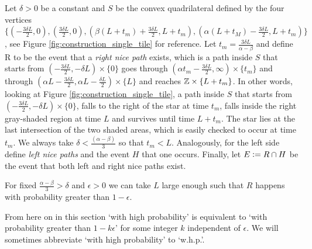Let $\delta > 0$ be a constant and $S$ be the convex quadrilateral defined by the four vertices $\{(- \frac{3 \delta L}{2}, 0), (\frac{3 \delta L}{2}, 0), (\beta (L + t_m) + \frac{3 \delta L}{2}, L + t_m), (\alpha (L + t_M) - \frac{3 \delta L}{2}, L + t_m) \}$, see Figure \ref{fig:construction_single_tile} for reference. Let $t_m = \frac{3\delta L }{\alpha - \beta}$ and define R to be the event that a \textit{right nice path} exists, which is a path inside $S$ that starts from $(- \frac{3 \delta L}{2}, - \delta L) \times \{0\}$ goes through $(\alpha t_m - \frac{ 3 \delta L }{2}, \infty) \times \{t_m\}$ and through $(\alpha L - \frac{3 \delta L}{2},\alpha L - \frac{\delta L}{2}) \times \{L\}$ and reaches $\mathbb{Z} \times \{ L + t_m \}$. In other words, looking at Figure \ref{fig:construction_single_tile}, a path inside $S$ that starts from $(- \frac{3 \delta L}{2}, - \delta L) \times \{0\}$, falls to the right of the star at time $t_m$, falls inside the right gray-shaded region at time $L$ and survives until time $L + t_m$. The star lies at the last intersection of the two shaded areas, which is easily checked to occur at time $t_m$. We always take $\delta < \frac{(\alpha - \beta)}{3}$ so that $t_m < L$. Analogously, for the left side define \textit{left nice paths} and the event $H$ that one occurs. Finally, let $E \vcentcolon= R \cap H$ be the event that both left and right nice paths exist. \\

\begin{lemma}\label{lem:construction}
For fixed $\frac{\alpha - \beta}{3} > \delta$ and $\epsilon > 0$ we can take $L$ large enough such that $R$ happens with probability greater than $1 - \epsilon$.  
\end{lemma}

\begin{remark}
From here on in this section `with high probability' is equivalent to `with probability greater than $1 - k \epsilon$' for some integer $k$ independent of $\epsilon$. We will sometimes abbreviate `with high probability' to `w.h.p.'.  
\end{remark}


